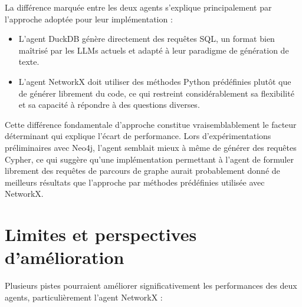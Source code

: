 \documentclass[a4paper,11pt]{article}
\begin{document}
La différence marquée entre les deux agents s'explique principalement par l'approche adoptée pour leur implémentation :

\begin{itemize}
    \item L'agent DuckDB génère directement des requêtes SQL, un format bien maîtrisé par les LLMs actuels et adapté à leur paradigme de génération de texte.
    
    \item L'agent NetworkX doit utiliser des méthodes Python prédéfinies plutôt que de générer librement du code, ce qui restreint considérablement sa flexibilité et sa capacité à répondre à des questions diverses.
\end{itemize}

Cette différence fondamentale d'approche constitue vraisemblablement le facteur déterminant qui explique l'écart de performance. Lors d'expérimentations préliminaires avec Neo4j, l'agent semblait mieux à même de générer des requêtes Cypher, ce qui suggère qu'une implémentation permettant à l'agent de formuler librement des requêtes de parcours de graphe aurait probablement donné de meilleurs résultats que l'approche par méthodes prédéfinies utilisée avec NetworkX.

\section{Limites et perspectives d'amélioration}
\label{sec:limites}

Plusieurs pistes pourraient améliorer significativement les performances des deux agents, particulièrement l'agent NetworkX :
\end{document}
